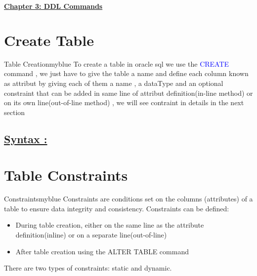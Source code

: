 \newpage 
\null 
\vspace{0.15cm}

\begin{center} 
\Huge{\textbf{\underline{Chapter 3: DDL Commands}}}
\end{center}

\vspace{0.25cm}

\setcounter{section}{0}


\section{Create Table}
\begin{prettyBox}{Table Creation}{myblue}
    To create a table in oracle sql we use the \textcolor{blue}{CREATE} command , we just have to give the table a name and define each column known as attribut
by giving each of them a name , a dataType and an optional constraint that can be added in same line of
attribut definition(in-line method) or on its own line(out-of-line method) , we will see contraint in details in the next section
\end{prettyBox}

\vspace{0.5cm}
\subsection*{\underline{Syntax :}}




\vspace{0.5cm}
\section{Table Constraints}

\begin{prettyBox}{Constraints}{myblue}
Constraints are conditions set on the columns (attributes) of a table to ensure data integrity and consistency. Constraints can be defined:
\begin{itemize}
    \item During table creation, either on the same line as the attribute definition(inline) or on a separate line(out-of-line)
    \item After table creation using the ALTER TABLE command
\end{itemize}

There are two types of constraints: static and dynamic.
\end{prettyBox}

